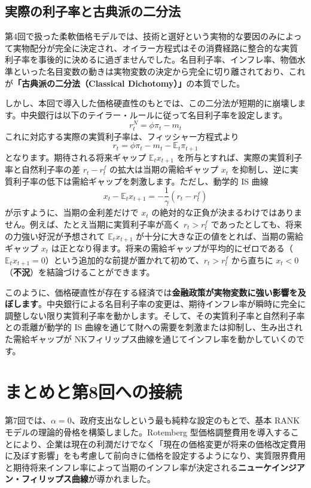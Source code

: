 \documentclass[
  japanese,
  lualatex,
  ja=standard,
  12pt,
  a4paper]{ltjsarticle}
\begin{document}
\Needspace{0.30\textheight}

\subsection{実際の利子率と古典派の二分法}\label{ux5b9fux969bux306eux5229ux5b50ux7387ux3068ux53e4ux5178ux6d3eux306eux4e8cux5206ux6cd5}

第4回で扱った柔軟価格モデルでは、技術と選好という実物的な要因のみによって実物配分が完全に決定され、オイラー方程式はその消費経路に整合的な実質利子率を事後的に決めるに過ぎませんでした。名目利子率、インフレ率、物価水準といった名目変数の動きは実物変数の決定から完全に切り離されており、これが\textbf{「古典派の二分法（Classical
Dichotomy）」}の本質でした。

しかし、本回で導入した価格硬直性のもとでは、この二分法が短期的に崩壊します。中央銀行は以下のテイラー・ルールに従って名目利子率を設定します。
\[
r_t^N=\phi\pi_t-m_t
\] これに対応する実際の実質利子率は、フィッシャー方程式より \[
r_t=\phi\pi_t-m_t-\mathbb{E}_t\pi_{t+1}
\] となります。期待される将来ギャップ \(\mathbb{E}_t x_{t+1}\)
を所与とすれば、実際の実質利子率と自然利子率の差 \(r_t - r_t^f\)
の拡大は当期の需給ギャップ \(x_t\)
を抑制し、逆に実質利子率の低下は需給ギャップを刺激します。ただし、動学的
IS 曲線 \[
x_t-\mathbb{E}_t x_{t+1}
=-\frac{1}{\gamma}(r_t-r_t^f)
\] が示すように、当期の金利差だけで \(x_t\)
の絶対的な正負が決まるわけではありません。例えば、たとえ当期に実質利子率が高く
\(r_t>r_t^f\) であったとしても、将来の力強い好況が予想されて
\(\mathbb{E}_t x_{t+1}\)
が十分に大きな正の値をとれば、当期の需給ギャップ \(x_t\)
は正となり得ます。将来の需給ギャップが平均的にゼロである（\(\mathbb{E}_t x_{t+1}=0\)）という追加的な前提が置かれて初めて、\(r_t>r_t^f\)
から直ちに \(x_t<0\)（\textbf{不況}）を結論づけることができます。

このように、価格硬直性が存在する経済では\textbf{金融政策が実物変数に強い影響を及ぼします}。中央銀行による名目利子率の変更は、期待インフレ率が瞬時に完全に調整しない限り実質利子率を動かします。そして、その実質利子率と自然利子率との乖離が動学的
IS 曲線を通じて財への需要を刺激または抑制し、生み出された需給ギャップが
NKフィリップス曲線を通じてインフレ率を動かしていくのです。

\section{まとめと第8回への接続}\label{ux307eux3068ux3081ux3068ux7b2c8ux56deux3078ux306eux63a5ux7d9a}

第7回では、\(\alpha=0\)、政府支出なしという最も純粋な設定のもとで、基本
RANK モデルの理論的骨格を構築しました。Rotemberg
型価格調整費用を導入することにより、企業は現在の利潤だけでなく「現在の価格変更が将来の価格改定費用に及ぼす影響」をも考慮して前向きに価格を設定するようになり、実質限界費用と期待将来インフレ率によって当期のインフレ率が決定される\textbf{ニューケインジアン・フィリップス曲線}が導かれました。
\end{document}
